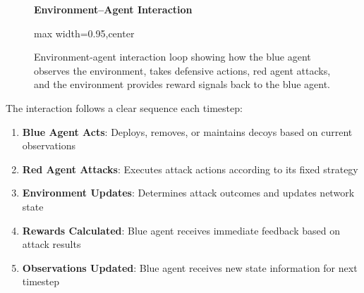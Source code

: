 \documentclass[12pt,oneside]{article}
\begin{document}
\begin{figure}[H]
\centering
\textbf{Environment--Agent Interaction}
\medskip
\begin{adjustbox}{max width=0.95\linewidth,center}
\end{adjustbox}
\caption{Environment-agent interaction loop showing how the blue agent observes the environment, takes defensive actions, red agent attacks, and the environment provides reward signals back to the blue agent.}
\label{fig:environment_interaction}
\end{figure}

The interaction follows a clear sequence each timestep:
\begin{enumerate}
\item \textbf{Blue Agent Acts}: Deploys, removes, or maintains decoys based on current observations
\item \textbf{Red Agent Attacks}: Executes attack actions according to its fixed strategy
\item \textbf{Environment Updates}: Determines attack outcomes and updates network state
\item \textbf{Rewards Calculated}: Blue agent receives immediate feedback based on attack results
\item \textbf{Observations Updated}: Blue agent receives new state information for next timestep
\end{enumerate}
\end{document}
